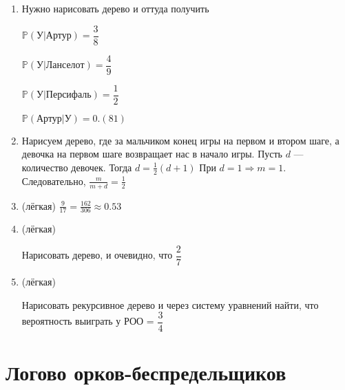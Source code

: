 \documentclass[a4paper,12pt]{article}
\def \P{\mathbb{P}}
\begin{document}
\begin{enumerate}
\item
Нужно нарисовать дерево и оттуда получить

$\P(\text{У}|\text{Артур}) = \dfrac{3}{8}$

$\P(\text{У}|\text{Ланселот}) = \dfrac{4}{9}$

$\P(\text{У}|\text{Персифаль}) = \dfrac{1}{2}$

$\P(\text{Артур}|\text{У}) = 0.(81)$

\item
Нарисуем дерево, где за мальчиком конец игры на первом и втором шаге, а девочка на первом шаге возвращает нас в начало игры. 
Пусть $d$ — количество девочек. Тогда $d = \frac{1}{2}(d + 1)$ При $d = 1 \Rightarrow m = 1$. 
Следовательно, $\frac{m}{m+d} = \frac{1}{2}$
\item (лёгкая)
$\frac{9}{17} = \frac{162}{306} \approx 0.53$

\item (лёгкая)

Нарисовать дерево, и очевидно, что $\dfrac{2}{7}$

\item (лёгкая)

Нарисовать рекурсивное дерево и через систему уравнений найти, что вероятность выиграть у РОО = $\dfrac{3}{4}$

\end{enumerate}
\newpage


\section{Логово орков-беспредельщиков} %
\end{document}
